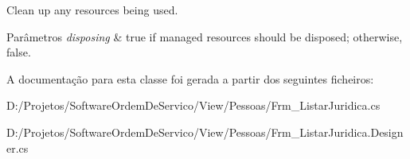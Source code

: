 Clean up any resources being used. 


\begin{DoxyParams}{Parâmetros}
{\em disposing} & true if managed resources should be disposed; otherwise, false.\\
\hline
\end{DoxyParams}


A documentação para esta classe foi gerada a partir dos seguintes ficheiros\+:\begin{DoxyCompactItemize}
\item 
D\+:/\+Projetos/\+Software\+Ordem\+De\+Servico/\+View/\+Pessoas/Frm\+\_\+\+Listar\+Juridica.\+cs\item 
D\+:/\+Projetos/\+Software\+Ordem\+De\+Servico/\+View/\+Pessoas/Frm\+\_\+\+Listar\+Juridica.\+Designer.\+cs\end{DoxyCompactItemize}
